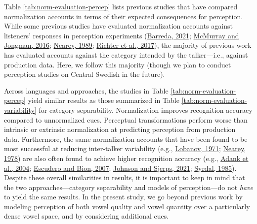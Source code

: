 \documentclass[utf8]{frontiersSCNS}
\begin{document}
Table \ref{tab:norm-evaluation-percep} lists previous studies that have compared normalization accounts in terms of their expected consequences for perception. While some previous studies have evaluated normalization accounts against listeners' responses in perception experiments (\protect\hyperlink{ref-barreda2021}{Barreda, 2021}; \protect\hyperlink{ref-mcmurray-jongman2016}{McMurray and Jongman, 2016}; \protect\hyperlink{ref-nearey1989}{Nearey, 1989}; \protect\hyperlink{ref-richter2017}{Richter et al., 2017}), the majority of previous work has evaluated accounts against the category intended by the talker---i.e., against production data. Here, we follow this majority (though we plan to conduct perception studies on Central Swedish in the future).

Across languages and approaches, the studies in Table \ref{tab:norm-evaluation-percep} yield similar results as those summarized in Table \ref{tab:norm-evaluation-variability} for category separability. Normalization improves recognition accuracy compared to unnormalized cues. Perceptual transformations perform worse than intrinsic or extrinsic normalization at predicting perception from production data. Furthermore, the same normalization accounts that have been found to be most successful at reducing inter-talker variability (e.g., \protect\hyperlink{ref-lobanov1971}{Lobanov, 1971}; \protect\hyperlink{ref-nearey1978}{Nearey, 1978}) are also often found to achieve higher recognition accuracy (e.g., \protect\hyperlink{ref-adank2004}{Adank et al., 2004}; \protect\hyperlink{ref-escudero2007}{Escudero and Bion, 2007}; \protect\hyperlink{ref-johnson-sjerps2021}{Johnson and Sjerps, 2021}; \protect\hyperlink{ref-syrda1985}{Syrdal, 1985}). Despite these overall similarities in results, it is important to keep in mind that the two approaches---category separability and models of perception---do not \emph{have} to yield the same results. In the present study, we go beyond previous work by modeling perception of both vowel quality and vowel quantity over a particularly dense vowel space, and by considering additional cues.
\end{document}
